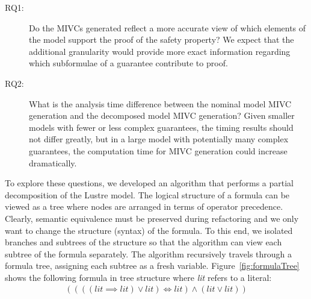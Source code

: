 \begin{description}
\item[RQ1:] Do the MIVCs generated reflect a more accurate view of which elements of the model support the proof of the safety property? We expect that the additional granularity would provide more exact information regarding which subformulae of a guarantee contribute to proof.

\item [RQ2:] What is the analysis time difference between the nominal model MIVC generation and the decomposed model MIVC generation? Given smaller models with fewer or less complex guarantees, the timing results should not differ greatly, but in a large model with potentially many complex guarantees, the computation time for MIVC generation could increase dramatically. 
 
\end{description}

To explore these questions, we developed an algorithm that performs a partial decomposition of the Lustre model. The logical structure of a formula can be viewed as a tree where nodes are arranged in terms of operator precedence. Clearly, semantic equivalence must be preserved during refactoring and we only want to change the structure (syntax) of the formula. To this end, we isolated branches and subtrees of the structure so that the \aivcalg algorithm can view each subtree of the formula separately. The algorithm recursively travels through a formula tree, assigning each subtree as a fresh variable. Figure~\ref{fig:formulaTree} shows the following formula in tree structure where \textit{lit} refers to a literal:
\begin{gather*}
((((\mathit{lit} \implies \mathit{lit}) \lor \mathit{lit}) \iff \mathit{lit} ) \land (\mathit{lit}  \lor \mathit{lit} )) 
\end{gather*} 

